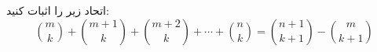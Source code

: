 \p
اتحاد زیر را اثبات کنید:
$$\binom{m}{k} + \binom{m + 1}{k} + \binom{m + 2}{k} + \cdots + \binom{n}{k} = \binom{n + 1}{k + 1} - \binom{m}{k + 1}$$